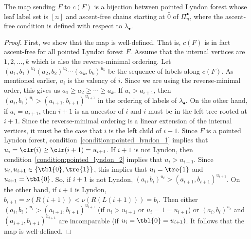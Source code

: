 \begin{theo}\label{thm:bijectionBetweenForestAndChain}
The map sending $F$ to $c(F)$ is a bijection between pointed Lyndon forest whose leaf label set is $[n]$ and ascent-free chains starting at $\hat{0}$ of $\Pi_n^\bullet$, where the  ascent-free condition is defined with respect to $\lambda_\bullet$.
\end{theo}
\begin{proof}
First, we show that the map  is well-defined.   That is, $c(F)$ is in fact ascent-free for all pointed Lyndon forest $F$.  Assume that the internal vertices are  $1,2,\dots, k$ which is also the reverse-minimal ordering.   Let $(a_1,b_1)^{u_1}(a_2,b_2)^{u_2}\cdots (a_{k},b_{k})^{u_{k}}$ be the sequence of labels along $c(F)$.   As mentioned earlier, $a_i$ is the valency of $i$. Since we are using the reverse-minimal order, this gives us $a_1\geq a_2\geq \cdots \geq a_k$.  If $a_i> a_{i+1}$, then $(a_i,b_i)^{u_i} > (a_{i+1},b_{i+1})^{u_{i+1}}$ in the ordering of labels of $\lambda_\bullet$.  On the other hand, if $a_i=a_{i+1}$,  then  $i+1$ is an ancestor of $i$ and $i$ must be in the left tree rooted at $i+1$.  Since the reverse-minimal ordering is a linear extension of the internal vertices, it must be the case that $i$ is the left child of $i+1$.  Since $F$ is a  pointed Lyndon forest, condition~\eqref{condition:pointed_lyndon_1} implies that $u_i = \clr(i) \geq \clr(i+1) =u_{i+1}$.  If $i+1$ is not Lyndon, then condition~\eqref{condition:pointed_lyndon_2} implies that $u_i>u_{i+1}$. Since $u_i,u_{i+1}\in \{\tbl{0},\tre{1}\}$, this implies that $u_i=\tre{1}$ and $u_{i+1}=\tbl{0}$. So, if $i+1$ is not Lyndon, $(a_i,b_i)^{u_i} > (a_{i+1},b_{i+1})^{u_{i+1}}$.  On the other hand, if $i+1$ is Lyndon, $b_{i+1}=\nu(R(i+1)) <\nu(R(L(i+1))) =b_{i}$.  Then either $(a_i,b_i)^{u_i} > (a_{i+1},b_{i+1})^{u_{i+1}}$ (if $u_i>u_{i+1}$  or $u_i=1=u_{i+1}$) or   $(a_i,b_i)^{u_i}$ and $(a_{i+1},b_{i+1})^{u_{i+1}}$  are incomparable (if $u_i=\tbl{0}=u_{i+1})$.   It follows that the map is well-defined.
  

\end{proof}
